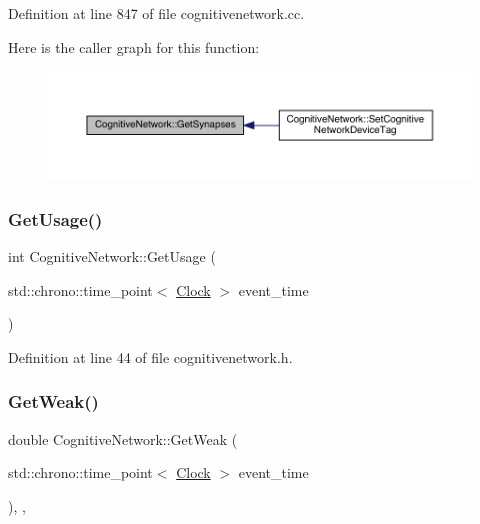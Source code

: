 Definition at line 847 of file cognitivenetwork.\+cc.

Here is the caller graph for this function\+:
\nopagebreak
\begin{figure}[H]
\begin{center}
\leavevmode
\includegraphics[width=350pt]{class_cognitive_network_aa3376f2e7aed9639c2b5ba27aa6fb314_icgraph}
\end{center}
\end{figure}
\mbox{\label{class_cognitive_network_ad293916cfa0e454ef40d7e228d0dcba3}} 
\subsubsection{\texorpdfstring{Get\+Usage()}{GetUsage()}}
{\footnotesize\ttfamily int Cognitive\+Network\+::\+Get\+Usage (\begin{DoxyParamCaption}\item[{std\+::chrono\+::time\+\_\+point$<$ \hyperlink{universe_8h_a0ef8d951d1ca5ab3cfaf7ab4c7a6fd80}{Clock} $>$}]{event\+\_\+time }\end{DoxyParamCaption})\hspace{0.3cm}{\ttfamily [inline]}}



Definition at line 44 of file cognitivenetwork.\+h.

\mbox{\label{class_cognitive_network_a761db75ac8eab7b4625e5a398891bd12}} 
\subsubsection{\texorpdfstring{Get\+Weak()}{GetWeak()}}
{\footnotesize\ttfamily double Cognitive\+Network\+::\+Get\+Weak (\begin{DoxyParamCaption}\item[{std\+::chrono\+::time\+\_\+point$<$ \hyperlink{universe_8h_a0ef8d951d1ca5ab3cfaf7ab4c7a6fd80}{Clock} $>$}]{event\+\_\+time }\end{DoxyParamCaption})\hspace{0.3cm}{\ttfamily [inline]}, {\ttfamily [final]}, {\ttfamily [virtual]}}



